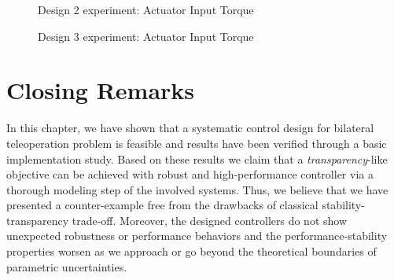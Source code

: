 \begin{figure}%
\centering
{}
\caption{Design 2 experiment: Actuator Input Torque}%
\label{fig:app:design2actoverall}%
\end{figure}

\begin{figure}%
\centering
{}
\caption{Design 3 experiment: Actuator Input Torque}%
\label{fig:app:design3actoverall}%
\end{figure}

\clearpage

\section{Closing Remarks}

In this chapter, we have shown that a systematic control design for bilateral teleoperation problem is feasible and results have been 
verified through a basic implementation study. Based on these results we claim that a \emph{transparency}-like objective can be achieved with 
robust and high-performance controller via a thorough modeling step of the involved systems. Thus, we believe that we have presented a 
counter-example free from the drawbacks of classical stability-transparency trade-off. Moreover, the designed controllers do not show
unexpected robustness or performance behaviors and the performance-stability properties worsen as we approach or go beyond the theoretical
boundaries of parametric uncertainties. 

